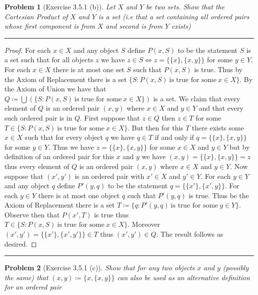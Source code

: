 \documentclass{article}
\newcommand{\lined}{\noindent\rule{\textwidth}{1pt}}
\newtheorem*{problem}{Problem}
\begin{document}
	\begin{problem}[Exercise 3.5.1 (b)]
		Let $X$ and $Y$ be two sets. Show that the Cartesian Product of $X$ and $Y$ is a set (i.e that a set containing
		all ordered pairs whose first component is from $X$ and second is from $Y$ exists)
	\end{problem}

	\lined
	\begin{proof}
		For each $x \in X$ and any object $S$ define $P(x,S)$ to be the statement $S$ is a set such that for all objects $z$ we have
		$z \in S \iff z = \{\{x\},\{x,y\}\}$ for some $y \in Y$. For each $x \in X$ there is at most one set $S$ such that $P(x,S)$ is true. Thus by the Axiom of Replacement there is a set $\{S:P(x,S)\ \text{is true for some}\ x \in X\}$. By the Axiom of 
		Union we have that $Q \coloneqq \bigcup (\{S:P(x,S)\ \text{is true for some}\ x \in X\})$ is a set. We claim that every element of $Q$ is an ordered pair $(x,y)$ where $x \in X$ and $y \in Y$ and that every such ordered pair is in $Q$. First suppose that $z \in Q$ then $z \in T$ for some $T \in \{S:P(x,S)\ \text{is true for some}\ x \in X\}$. But then for this $T$ there exists some $x \in X$ such that for every object $q$ we have $q \in T$ if and only if $q = \{\{x\},\{x,y\}\}$ for some $y \in Y$. Thus we have $z = \{\{x\},\{x,y\}\}$ for some $x \in X$ and $y \in Y$ but by definition of an ordered pair for this $x$ and $y$ we have $(x,y) = \{\{x\},\{x,y\}\} = z$ thus every element of $Q$ is an ordered pair $(x,y)$ where $x \in X$ and $y \in Y$. Now suppose that $(x',y')$ is an ordered pair with $x' \in X$ and $y' \in Y$. For each $y \in Y$ and any object $q$ define $P'(y,q)$ to be the statement $q = \{\{x'\},\{x',y\}\}$. For each $y \in Y$ there is at most one object $q$ such that $P'(y,q)$ is true. Thus be the Axiom of Replacement there is a set $T \coloneqq \{q:P'(y,q)\ \text{is true for some}\ y \in Y\}$. Observe then that $P(x',T)$ is true thus $T \in \{S:P(x,S)\ \text{is true for some}\ x \in X\}$. Moreover $(x',y') = \{\{x'\},\{x',y'\}\} \in T$ thus $(x',y') \in Q$. The result follows as desired.
		 
	\end{proof}
	\lined
	
	\newpage
	
	\begin{problem}[Exercise 3.5.1 (c)]
		Show that for any two objects $x$ and $y$ (possibly the same) that $(x,y) \coloneqq \{x,\{x,y\}\}$ can also be used as
		an alternative definition for an ordered pair
	\end{problem}
\end{document}
